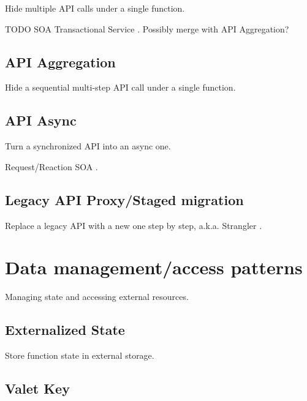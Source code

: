 Hide multiple API calls under a single function.

TODO SOA Transactional Service \parencite{rotem12soa}. Possibly merge with API Aggregation?

\subsection{API Aggregation} \label{subsec:apiAggregation}

Hide a sequential multi-step API call under a single function.

\subsection{API Async} \label{subsec:apiAsync}

Turn a synchronized API into an async one.

Request/Reaction SOA \parencite{rotem12soa}.

\subsection{Legacy API Proxy/Staged migration} \label{subsec:legacyApi}

Replace a legacy API with a new one step by step, a.k.a. Strangler \parencite{microsoft18cloudPatterns}.



\section{Data management/access patterns} \label{sec:dataManagementPatterns}

Managing state and accessing external resources.

\subsection{Externalized State} \label{subsec:externalizedState}

Store function state in external storage.

\subsection{Valet Key} \label{subsec:valetKey}

